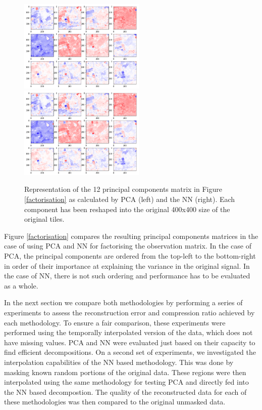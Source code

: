 \documentclass[essd, manuscript]{copernicus}
\begin{document}
\begin{figure}%
    {{\includegraphics[width=6cm]{fig4.png} }}%
    {{\includegraphics[width=6cm]{fig4.png} }}%
	\caption{Representation of the 12 principal components matrix in Figure \ref{factorisation} as calculated by PCA (left) and the NN (right). Each component has been reshaped into the original 400x400 size of the original tiles.}%
    \label{pcs}%
\end{figure}

Figure \ref{factorisation} compares the resulting principal components matrices in the case of using PCA and NN for factorising the observation matrix. In the case of PCA, the principal components are ordered from the top-left to the bottom-right in order of their importance at explaining the variance in the original signal. In the case of NN, there is not such ordering and performance has to be evaluated as a whole. 

In the next section we compare both methodologies by performing a series of experiments to assess the reconstruction error and compression ratio achieved by each methodology. To ensure a fair comparison, these experiments were performed using the temporally interpolated version of the data, which does not have missing values. PCA and NN were evaluated just based on their capacity to find efficient decompositions. On a second set of experiments, we investigated the interpolation capabilities of the NN based methodology. This was done by masking known random portions of the original data. These regions were then interpolated using the same methodology for testing PCA and directly fed into the NN based decompostion. The quality of the reconstructed data for each of these methodologies was then compared to the original unmasked data.
\end{document}
